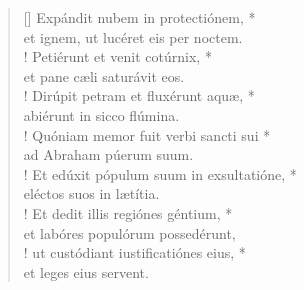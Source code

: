 \begin{verse}[\versewidth]
Expándit nubem in protectiónem, *\\
et ignem, ut lucéret eis per noctem.\\!
\vin Petiérunt et venit cotúrnix, *\\
\vin et pane cæli saturávit eos.\\!
Dirúpit petram et fluxérunt aquæ, *\\
abiérunt in sicco flúmina.\\!
\vin Quóniam memor fuit verbi sancti sui *\\
\vin ad Abraham púerum suum.\\!
Et edúxit pópulum suum in exsultatióne, *\\
eléctos suos in lætítia.\\!
\vin Et dedit illis regiónes géntium, *\\
\vin et labóres populórum possedérunt,\\!
ut custódiant iustificatiónes eius, *\\
et leges eius servent.\\
\end{verse}
\vspace{1cm}


